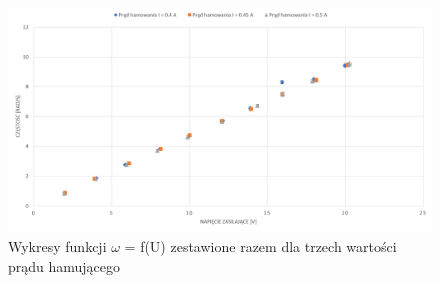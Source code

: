 \documentclass[12pt, a4paper, oneside]{article}
\begin{document}
\clearpage
\begin{figure}[h]
\centering
\caption{Wykresy funkcji $\omega$ = f(U) zestawione razem dla trzech wartości prądu hamującego}
\includegraphics[scale=0.34]{f7.png}
\end{figure}
\end{document}

